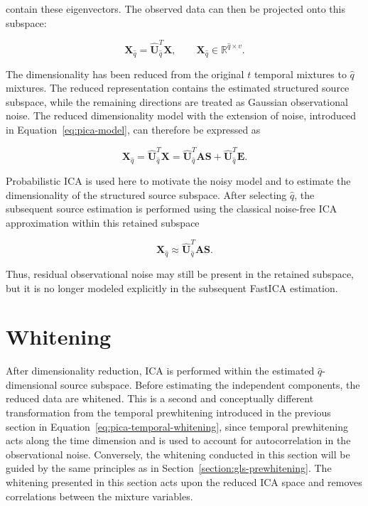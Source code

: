 \documentclass[english]{pwr_wmat_praca_dyplomowa}
\theoremstyle{definition}
\theoremstyle{remark}
\begin{document}
contain these eigenvectors. The observed data can then be projected onto this subspace:

\begin{equation}
    \mathbf{X}_{\widehat{q}} = \widehat{\mathbf{U}}_{\widehat{q}}^T \mathbf{X},
    \qquad \mathbf{X}_{\widehat{q}} \in \mathbb{R}^{\widehat{q}\times v}.
    \label{eq:pica-dimensionality-reduction}
\end{equation}

The dimensionality has been reduced from the original $t$ temporal mixtures to $\widehat{q}$ mixtures. The reduced representation contains the estimated structured source subspace, while the remaining directions are treated as Gaussian observational noise. The reduced dimensionality model with the extension of noise, introduced in Equation~\eqref{eq:pica-model}, can therefore be expressed as

\begin{equation}
    \mathbf{X}_{\widehat{q}} 
    = \widehat{\mathbf{U}}_{\widehat{q}}^T \mathbf{X}
    = \widehat{\mathbf{U}}_{\widehat{q}}^T \mathbf{A}\mathbf{S} + \widehat{\mathbf{U}}_{\widehat{q}}^T\mathbf{E}.
\end{equation}

\newpage
Probabilistic ICA is used here to motivate the noisy model and to estimate the dimensionality of the structured source subspace. After selecting $\widehat{q}$, the subsequent source estimation is performed using the classical noise-free ICA approximation within this retained subspace

\begin{equation}
    \mathbf{X}_{\widehat{q}} \approx \widehat{\mathbf{U}}_{\widehat{q}}^T \mathbf{A}\mathbf{S}.
    \label{eq:noise-free-ica-approx}
\end{equation}

Thus, residual observational noise may still be present in the retained subspace, but it is no longer modeled explicitly in the subsequent FastICA estimation.

\section{Whitening}
\label{section:ica-whitening}

After dimensionality reduction, ICA is performed within the estimated $\widehat{q}$-dimensional source subspace. Before estimating the independent components, the reduced data are whitened. This is a second and conceptually different transformation from the temporal prewhitening introduced in the previous section in Equation~\eqref{eq:pica-temporal-whitening}, since temporal prewhitening acts along the time dimension and is used to account for autocorrelation in the observational noise. Conversely, the whitening conducted in this section will be guided by the same principles as in Section~\ref{section:gls-prewhitening}. The whitening presented in this section acts upon the reduced ICA space and removes correlations between the mixture variables.
\end{document}
